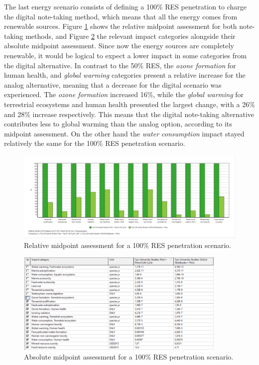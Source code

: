 The last energy scenario consists of defining a 100\% RES penetration to charge the digital note-taking method, which means that all the energy comes from renewable sources. Figure \ref{fig:characterization_RES_100} shows the relative midpoint assessment for both note-taking methods, and Figure \ref{fig:characterization_table_RES_100} the relevant impact categories alongside their absolute midpoint assessment. Since now the energy sources are completely renewable, it would be logical to expect a lower impact in some categories from the digital alternative. In contrast to the 50\% RES, the \textit{ozone formation} for human health, and \textit{global warming} categories present a relative increase for the analog alternative, meaning that a decrease for the digital scenario was experienced. The \textit{ozone formation} increased 16\%, while the \textit{global warming} for terrestrial ecosystems and human health presented the largest change, with a 26\% and 28\% increase respectively. This means that the digital note-taking alternative contributes less to global warming than the analog option, according to its midpoint assessment. On the other hand the \textit{water consumption} impact stayed relatively the same for the 100\% RES penetration scenario.

\begin{figure}[H]
    \centering
    \includegraphics[width=\textwidth]{images/RES_100/Characterization_RES_100.JPG}
    \caption{Relative midpoint assessment for a 100\% RES penetration scenario.}\label{fig:characterization_RES_100}
\end{figure}

\begin{figure}[H]
    \centering
    \includegraphics[width=0.9\textwidth]{images/RES_100/Characterization_Table_RES_100.PNG}
    \caption{Absolute midpoint assessment for a 100\% RES penetration scenario.}\label{fig:characterization_table_RES_100}
\end{figure}

